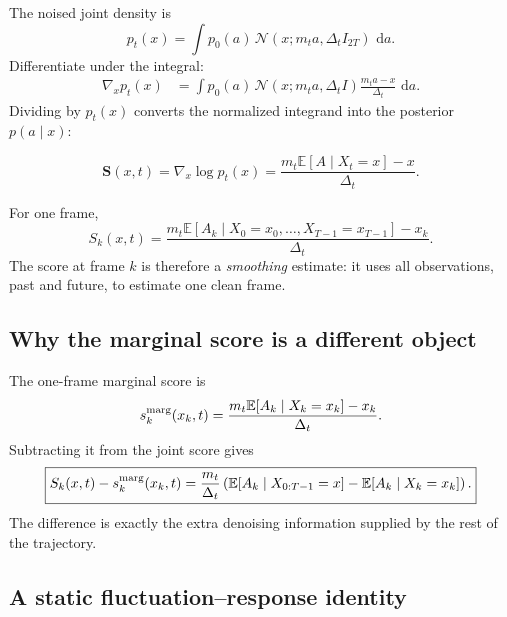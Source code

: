 \documentclass[11pt,a4paper]{article}
\newcommand{\E}{\mathbb{E}}
\newcommand{\N}{\mathcal{N}}
\newcommand{\score}{\bm S}
\newcommand{\dd}{\,\mathrm d}
\begin{document}
The noised joint density is
\begin{equation}
 p_t(x)=\int p_0(a)\,\N(x;m_ta,\Delta_t I_{2T})\,\dd a.
 \label{eq:noised-density}
\end{equation}
Differentiate under the integral:
\begin{align}
 \nabla_x p_t(x)
 &=\int p_0(a)\,\N(x;m_ta,\Delta_t I)
 \frac{m_ta-x}{\Delta_t}\,\dd a.
\end{align}
Dividing by $p_t(x)$ converts the normalized integrand into the posterior $p(a\mid x)$:
\begin{keyresult}
\begin{equation}
 \boxed{
 \score(x,t)=\nabla_x\log p_t(x)
 =\frac{m_t\E[A\mid X_t=x]-x}{\Delta_t}.}
 \label{eq:score-posterior}
\end{equation}
\end{keyresult}
For one frame,
\begin{equation}
 \boxed{
 S_k(x,t)=\frac{m_t\E[A_k\mid X_0=x_0,\ldots,X_{T-1}=x_{T-1}]-x_k}{\Delta_t}.}
 \label{eq:block-score}
\end{equation}
The score at frame $k$ is therefore a \emph{smoothing} estimate: it uses all observations, past and future, to estimate one clean frame.

\subsection{Why the marginal score is a different object}

The one-frame marginal score is
\begin{equation}
 s_k^{\rm marg}(x_k,t)
 =\frac{m_t\E[A_k\mid X_k=x_k]-x_k}{\Delta_t}.
\end{equation}
Subtracting it from the joint score gives
\begin{equation}
 \boxed{
 S_k(x,t)-s_k^{\rm marg}(x_k,t)
 =\frac{m_t}{\Delta_t}
 \left(
 \E[A_k\mid X_{0:T-1}=x]-\E[A_k\mid X_k=x_k]
 \right).}
 \label{eq:joint-marg-gap}
\end{equation}
The difference is exactly the extra denoising information supplied by the rest of the trajectory.

\subsection{A static fluctuation--response identity}
\end{document}

